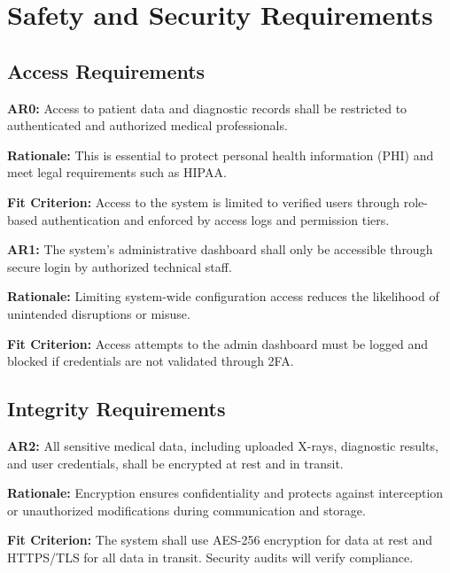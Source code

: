\documentclass{article}
\begin{document}
\section{Safety and Security Requirements}


\subsection{Access Requirements}

\textbf{AR0:} Access to patient data and diagnostic records shall be restricted to authenticated and authorized medical professionals.

\textbf{Rationale:} This is essential to protect personal health information (PHI) and meet legal requirements such as HIPAA.

\textbf{Fit Criterion:} Access to the system is limited to verified users through role-based authentication and enforced by access logs and permission tiers.

\textbf{AR1:} The system's administrative dashboard shall only be accessible through secure login by authorized technical staff.

\textbf{Rationale:} Limiting system-wide configuration access reduces the likelihood of unintended disruptions or misuse.

\textbf{Fit Criterion:} Access attempts to the admin dashboard must be logged and blocked if credentials are not validated through 2FA.

\subsection{Integrity Requirements}

\textbf{AR2:} All sensitive medical data, including uploaded X-rays, diagnostic results, and user credentials, shall be encrypted at rest and in transit.

\textbf{Rationale:} Encryption ensures confidentiality and protects against interception or unauthorized modifications during communication and storage.

\textbf{Fit Criterion:} The system shall use AES-256 encryption for data at rest and HTTPS/TLS for all data in transit. Security audits will verify compliance.
\end{document}
